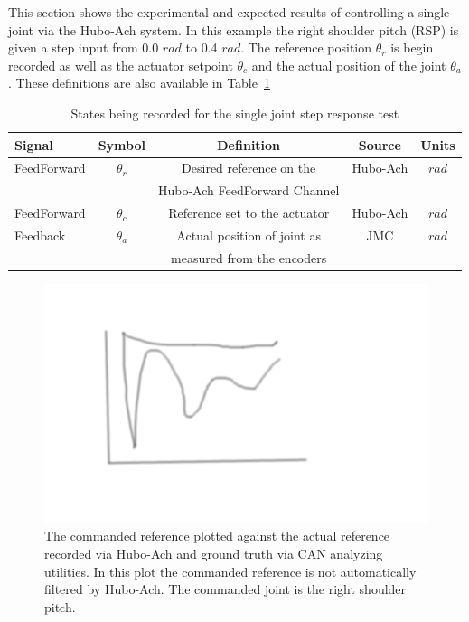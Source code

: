 This section shows the experimental and expected results of controlling a single joint via the Hubo-Ach system.
In this example the right shoulder pitch (RSP) is given a step input from 0.0 $rad$ to 0.4 $rad$.
The reference position $\theta_r$ is begin recorded as well as the actuator setpoint $\theta_c$ and the actual position of the joint $\theta_a$.
These definitions are also available in Table~\ref{table:recorded}

\begin{table}
\centering
\caption{States being recorded for the single joint step response test}
\begin{tabular}{l || c | c | c | c}
Signal      & Symbol     & Definition                    & Source      & Units \\
\hline
\hline
FeedForward & $\theta_r$ & Desired reference on the      & Hubo-Ach   & $rad$ \\
            &            & Hubo-Ach FeedForward Channel  &            &       \\
\hline
FeedForward & $\theta_c$ & Reference set to the actuator & Hubo-Ach   & $rad$ \\
\hline
Feedback    & $\theta_a$ & Actual position of joint as   & JMC        & $rad$ \\
            &            & measured from the encoders    &            &       \\
\hline
\end{tabular}
\label{table:recorded}
\end{table}



\begin{figure}[thpb]
  \centering
\includegraphics[width=0.8\columnwidth]{./pix/tmp.png}
  \caption{The commanded reference plotted against the actual reference recorded via Hubo-Ach and ground truth via CAN analyzing utilities.  In this plot the commanded reference is not automatically filtered by Hubo-Ach.  The commanded joint is the right shoulder pitch.}
  \label{fig:singleJointStep}
\end{figure}

